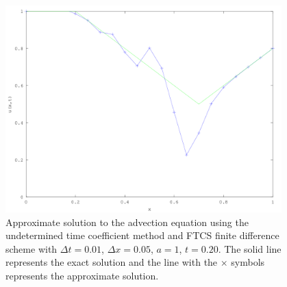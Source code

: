 \begin{figure}[h]
    \centering
    \includegraphics[width=0.95\textwidth]{diagrams/timeCoeffFTCS}
    \caption{Approximate solution to the advection equation using the undetermined time coefficient method and FTCS finite difference scheme with $\Delta t = 0.01$, $\Delta x = 0.05$, $a = 1$, $t = 0.20$.
    The solid line represents the exact solution and the line with the $\times$ symbols represents the approximate solution.}
    \label{timeCoeffWedge}
\end{figure}

